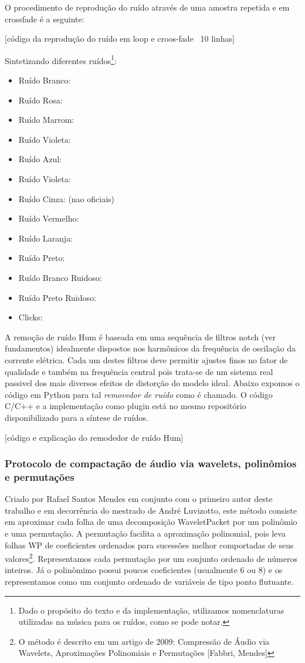 O procedimento de reprodução do ruído através de uma amostra repetida e em crossfade é a seguinte:

[código da reprodução do ruído em loop e croos-fade ~10 linhas]

Sintetizando diferentes ruídos\footnote{Dado o propósito do texto e da implementação, utilizamos nomenclaturas utilizadas na música para os ruídos, como se pode notar.}:
\begin{itemize}
    \item Ruído Branco: 
    \item Ruído Rosa:
    \item Ruído Marrom:
    \item Ruído Violeta:
    \item Ruído Azul:
    \item Ruído Violeta:
    \item Ruído Cinza:
    (nao oficiais)
    \item Ruído Vermelho:
    \item Ruído Laranja:
    \item Ruído Preto:
    \item Ruído Branco Ruidoso:
    \item Ruído Preto Ruidoso:
    \item Clicks:
\end{itemize} 

A remoção de ruído Hum é baseada em uma sequência de filtros notch (ver fundamentos) idealmente dispostos nos harmônicos da frequência de oscilação da corrente elétrica. Cada um destes filtros deve permitir ajustes finos no fator de qualidade e também na frequência central pois trata-se de um sistema real passivel dos mais diversos efeitos de distorção do modelo ideal. Abaixo expomos o código em Python para tal \emph{removedor de ruído} como é chamado. O código C/C++ e a implementação como plugin está no mesmo repositório disponibilizado para a síntese de ruídos.

[código e explicação do remodedor de ruído Hum]


      \subsubsection{Protocolo de compactação de áudio via wavelets, polinômios e permutações}
Criado por Rafael Santos Mendes em conjunto com o primeiro autor deste trabalho e em decorrência do mestrado de André Luvizotto, este método
consiste em aproximar cada folha de uma decomposição WaveletPacket por um polinômio e uma permutação. A permutação facilita a aproximação polinomial, pois leva folhas WP de coeficientes ordenados para sucessões melhor comportadas de seus valores\footnote{O método é descrito em um artigo de 2009: Compressão de Áudio via Wavelets, Aproximações Polinomiais e Permutações [Fabbri, Mendes]}.
Representamos cada permutação por um conjunto ordenado de números inteiros. Já o polinômimo possui poucos coeficientes (usualmente 6 ou 8) e os representamos como um conjunto ordenado de variáveis de tipo ponto flutuante.


